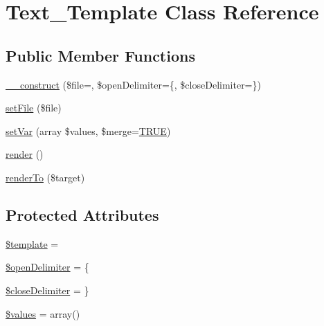 \hypertarget{class_text___template}{}\section{Text\+\_\+\+Template Class Reference}
\label{class_text___template}
\subsection*{Public Member Functions}
\begin{DoxyCompactItemize}
\item 
\mbox{\hyperlink{class_text___template_a5265a161c2510fb4219e82afd47143d1}{\+\_\+\+\_\+construct}} (\$file=\textquotesingle{}\textquotesingle{}, \$open\+Delimiter=\textquotesingle{}\{\textquotesingle{}, \$close\+Delimiter=\textquotesingle{}\}\textquotesingle{})
\item 
\mbox{\hyperlink{class_text___template_a786ea2bbab26bd4a0ecae24b253d17fe}{set\+File}} (\$file)
\item 
\mbox{\hyperlink{class_text___template_ad7a89bfd367400ebb91fc3600d6c3770}{set\+Var}} (array \$values, \$merge=\mbox{\hyperlink{constants_8php_ae04a3efe6aa42044f803ee90c2277846}{T\+R\+UE}})
\item 
\mbox{\hyperlink{class_text___template_afde88292c44dc59faf017738dae6dffb}{render}} ()
\item 
\mbox{\hyperlink{class_text___template_ab6a86d8a9247de41c28ea861372c3fb3}{render\+To}} (\$target)
\end{DoxyCompactItemize}
\subsection*{Protected Attributes}
\begin{DoxyCompactItemize}
\item 
\mbox{\hyperlink{class_text___template_aa3e9534005fd516d941f6a5569896e01}{\$template}} = \textquotesingle{}\textquotesingle{}
\item 
\mbox{\hyperlink{class_text___template_a08b423e518737fc0195536a20f966296}{\$open\+Delimiter}} = \textquotesingle{}\{\textquotesingle{}
\item 
\mbox{\hyperlink{class_text___template_a0d6a85f85e03020ae1d2cc2670252fa2}{\$close\+Delimiter}} = \textquotesingle{}\}\textquotesingle{}
\item 
\mbox{\hyperlink{class_text___template_affc45c6ace2eeb3f300b054dbf9592b6}{\$values}} = array()
\end{DoxyCompactItemize}


